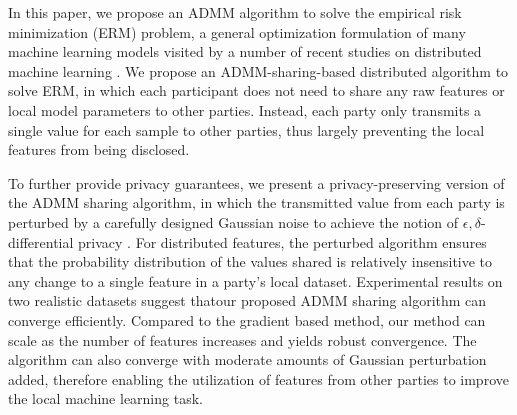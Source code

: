 In this paper, we propose an ADMM algorithm to solve the empirical risk minimization (ERM) problem, a general optimization formulation of many machine learning models visited by a number of recent studies on distributed machine learning  \cite{ying2018supervised,chaudhuri2011differentially}. We propose an ADMM-sharing-based distributed algorithm to solve ERM, in which each participant does not need to share any raw features or local model parameters to other parties. Instead, each party only transmits a single value for each sample to other parties, thus largely preventing the local features from being disclosed. 

To further provide privacy guarantees, we present a privacy-preserving version of the ADMM sharing algorithm, in which the transmitted value from each party is perturbed by a carefully designed Gaussian noise to achieve
the notion of $\epsilon,\delta$-differential privacy \cite{dwork2008differential,dwork2014algorithmic}. For distributed features, the perturbed algorithm ensures that the probability distribution of the values shared is relatively insensitive to any change to a single feature in a party's local dataset.
Experimental results on two realistic datasets suggest thatour proposed ADMM sharing algorithm can converge efficiently. Compared to the gradient based method, our method can scale as the number of features increases and yields robust convergence. The algorithm can also converge with moderate amounts of Gaussian perturbation added, therefore enabling the utilization of features from other parties to improve the local machine learning task.
